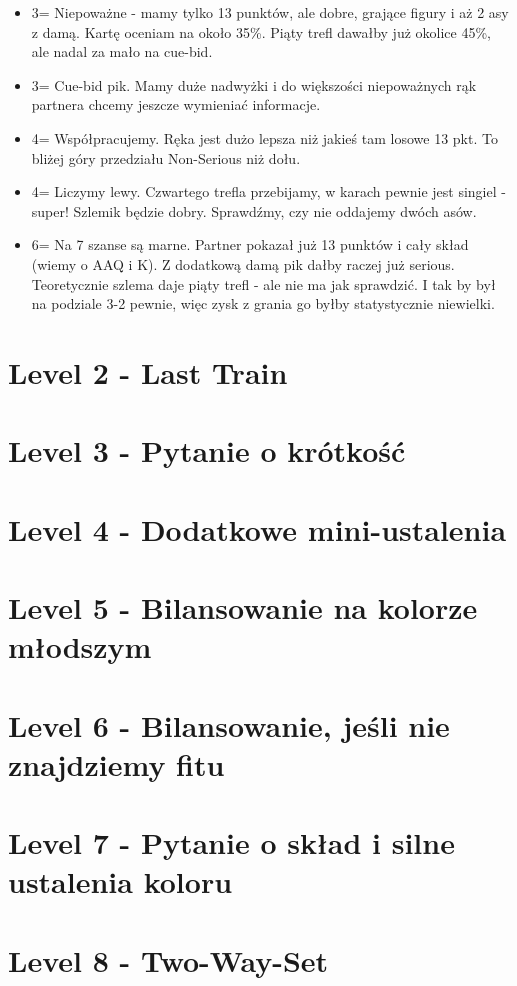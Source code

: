 \documentclass[12pt, a4paper]{article}
\begin{document}
\begin{itemize}
	\item 3\spades = Niepoważne - mamy tylko 13 punktów, ale dobre, grające figury i aż 2 asy z damą. Kartę oceniam na około 35\%. Piąty trefl dawałby już okolice 45\%, ale nadal za mało na cue-bid.
	\item 3\nt = Cue-bid pik. Mamy duże nadwyżki i do większości niepoważnych rąk partnera chcemy jeszcze wymieniać informacje.
	\item 4\clubs = Współpracujemy. Ręka jest dużo lepsza niż jakieś tam losowe 13 pkt. To bliżej góry przedziału Non-Serious niż dołu.
	\item 4\nt = Liczymy lewy. Czwartego trefla przebijamy, w karach pewnie jest singiel - super! Szlemik będzie dobry. Sprawdźmy, czy nie oddajemy dwóch asów.
	\item 6\hearts = Na 7 szanse są marne. Partner pokazał już 13 punktów i cały skład (wiemy o AAQ i \xclubs K). Z dodatkową damą pik dałby raczej już serious. Teoretycznie szlema daje piąty trefl - ale nie ma jak sprawdzić. I tak by był na podziale 3-2 pewnie, więc zysk z grania go byłby statystycznie niewielki.
\end{itemize}


\pagebreak
\section*{Level 2 - Last Train}

\vspace{2cm}
\section*{Level 3 - Pytanie o krótkość}

\vspace{2cm}
\section*{Level 4 - Dodatkowe mini-ustalenia}

\vspace{2cm}
\section*{Level 5 - Bilansowanie na kolorze młodszym}

\vspace{2cm}
\section*{Level 6 - Bilansowanie, jeśli nie znajdziemy fitu}

\vspace{2cm}
\section*{Level 7 - Pytanie o skład i silne ustalenia koloru}

\vspace{2cm}
\section*{Level 8 - Two-Way-Set}
\end{document}
